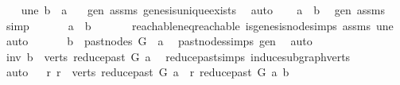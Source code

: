 \begin{isabellebody}
\ \ \isamarkupfalse%
\ une{\isacharcolon}{\kern0pt}\ {\isachardoublequoteopen}b\ {\isasymnoteq}\ a{\isachardoublequoteclose}\ \ \isamarkupfalse%
\ gen\ assms{\isacharparenleft}{\kern0pt}{}{\isacharparenright}{\kern0pt}\ genesis{\isacharunderscore}{\kern0pt}unique{\isacharunderscore}{\kern0pt}exists\ \isamarkupfalse%
\ auto\isanewline
\ \ \isamarkupfalse%
\ {\isachardoublequoteopen}a\ {\isasymrightarrow}\isactrlsup {\isacharasterisk}{\kern0pt}\ b{\isachardoublequoteclose}\ \isamarkupfalse%
\ gen\ assms{\isacharparenleft}{\kern0pt}{}{\isacharparenright}{\kern0pt}\ \isamarkupfalse%
\ simp\ \isanewline
\ \ \isamarkupfalse%
\ \isamarkupfalse%
\ {\isachardoublequoteopen}a\ {\isasymrightarrow}\isactrlsup {\isacharplus}{\kern0pt}\ b{\isachardoublequoteclose}\ \isanewline
\ \ \ \ \isamarkupfalse%
\ reachable{\isacharunderscore}{\kern0pt}neq{\isacharunderscore}{\kern0pt}reachable{}\ is{\isacharunderscore}{\kern0pt}genesis{\isacharunderscore}{\kern0pt}node{\isachardot}{\kern0pt}simps\ assms{\isacharparenleft}{\kern0pt}{}{\isacharparenright}{\kern0pt}\ une\ \isamarkupfalse%
\ auto\ \isanewline
\ \ \isamarkupfalse%
\ \isamarkupfalse%
\ {\isachardoublequoteopen}b\ {\isasymin}\ {\isacharparenleft}{\kern0pt}past{\isacharunderscore}{\kern0pt}nodes\ G\ \ a{\isacharparenright}{\kern0pt}{\isachardoublequoteclose}\ \isamarkupfalse%
\ past{\isacharunderscore}{\kern0pt}nodes{\isachardot}{\kern0pt}simps\ gen\ \isamarkupfalse%
\ auto\isanewline
\ \ \isamarkupfalse%
\ \isamarkupfalse%
\ inv{\isacharcolon}{\kern0pt}\ {\isachardoublequoteopen}b\ {\isasymin}\ verts\ {\isacharparenleft}{\kern0pt}reduce{\isacharunderscore}{\kern0pt}past\ G\ a{\isacharparenright}{\kern0pt}{\isachardoublequoteclose}\ \isamarkupfalse%
\ reduce{\isacharunderscore}{\kern0pt}past{\isachardot}{\kern0pt}simps\ induce{\isacharunderscore}{\kern0pt}subgraph{\isacharunderscore}{\kern0pt}verts\ \isanewline
\ \ \ \ \isamarkupfalse%
\ auto\isanewline
\ \ \isamarkupfalse%
{\isachardoublequoteopen}{\isasymforall}r{\isachardot}{\kern0pt}\ r\ {\isasymin}\ verts\ {\isacharparenleft}{\kern0pt}reduce{\isacharunderscore}{\kern0pt}past\ G\ a{\isacharparenright}{\kern0pt}\ {\isasymlongrightarrow}\ r\ {\isasymrightarrow}\isactrlsup {\isacharasterisk}{\kern0pt}\isactrlbsub reduce{\isacharunderscore}{\kern0pt}past\ G\ a\isactrlesub \ b{\isachardoublequoteclose}\ \isanewline

\end{isabellebody}
